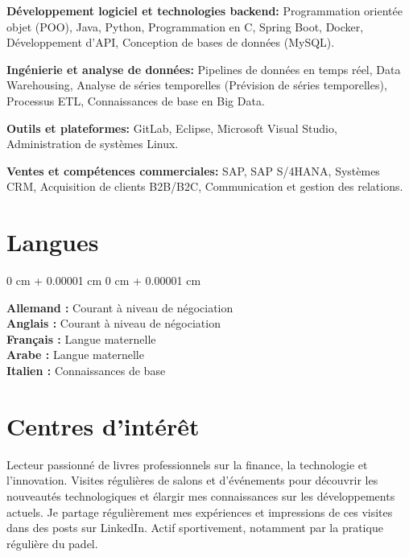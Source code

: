 \documentclass[10pt, letterpaper]{article}
\newenvironment{onecolentry}{
    \begin{adjustwidth}{
        0 cm + 0.00001 cm
    }{
        0 cm + 0.00001 cm
    }
}{
    \end{adjustwidth}
} %
\begin{document}
\textbf{Développement logiciel et technologies backend:}  
Programmation orientée objet (POO), Java, Python, Programmation en C, Spring Boot, Docker, Développement d'API, Conception de bases de données (MySQL).

\textbf{Ingénierie et analyse de données:}  
Pipelines de données en temps réel, Data Warehousing, Analyse de séries temporelles (Prévision de séries temporelles), Processus ETL, Connaissances de base en Big Data.

\textbf{Outils et plateformes:}  
GitLab, Eclipse, Microsoft Visual Studio, Administration de systèmes Linux.

\textbf{Ventes et compétences commerciales:}  
SAP, SAP S/4HANA, Systèmes CRM, Acquisition de clients B2B/B2C, Communication et gestion des relations.

\section{Langues}

\begin{onecolentry}
    \textbf{Allemand :} Courant à niveau de négociation \\
    \textbf{Anglais :} Courant à niveau de négociation \\
    \textbf{Français :} Langue maternelle \\
    \textbf{Arabe :} Langue maternelle \\
    \textbf{Italien :} Connaissances de base
\end{onecolentry}

\section{Centres d'intérêt}

Lecteur passionné de livres professionnels sur la finance, la technologie et l'innovation.  
Visites régulières de salons et d'événements pour découvrir les nouveautés technologiques et élargir mes connaissances sur les développements actuels.  
Je partage régulièrement mes expériences et impressions de ces visites dans des posts sur LinkedIn.  
Actif sportivement, notamment par la pratique régulière du padel.
    
\end{document}
